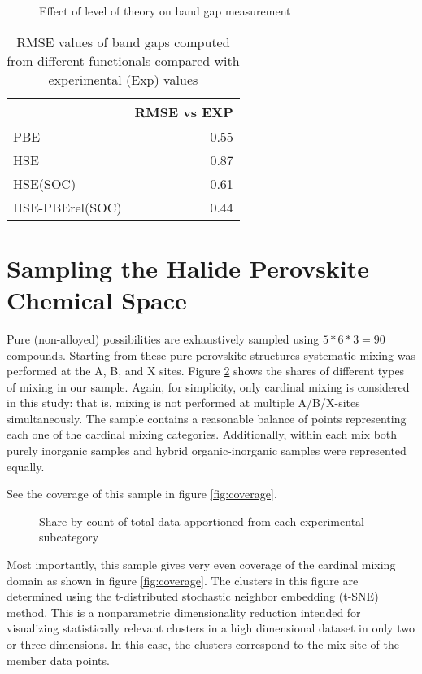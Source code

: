  
\begin{figure}[htbp]
\centering

\caption{\label{fig:expqual} Effect of level of theory on band gap measurement}
\end{figure}

 
\begin{table}[htbp]
\caption{\label{tbl:expquant} RMSE values of band gaps computed from different functionals compared with experimental (Exp) values}
\centering
\begin{tabular}{lr}
 & RMSE vs EXP\\[0pt]
\hline
PBE & 0.55\\[0pt]
HSE & 0.87\\[0pt]
HSE(SOC) & 0.61\\[0pt]
HSE-PBErel(SOC) & 0.44\\[0pt]
\end{tabular}
\end{table}

\section{Sampling the Halide Perovskite Chemical Space}
\label{sec:orgb990473}
Pure (non-alloyed) possibilities are exhaustively sampled using \(5*6*3 = 90\) compounds.
Starting from these pure perovskite structures systematic mixing was performed at the A, B, and X sites.
Figure \ref{fig:lot_mix_org} shows the shares of different types of mixing in our sample.
Again, for simplicity, only cardinal mixing is considered in this study: that is, mixing is not performed at multiple A/B/X-sites simultaneously.
The sample contains a reasonable balance of points representing each one of the cardinal mixing categories.
Additionally, within each mix both purely inorganic samples and hybrid organic-inorganic samples were represented equally.

See the coverage of this sample in figure \ref{fig:coverage}.

 
\begin{figure}[htbp]
\centering

\caption{\label{fig:lot_mix_org} Share by count of total data apportioned from each experimental subcategory}
\end{figure}

Most importantly, this sample gives very even coverage of the cardinal mixing domain as shown in figure \ref{fig:coverage}.
The clusters in this figure are determined using the t-distributed stochastic neighbor embedding (t-SNE) method.
This is a nonparametric dimensionality reduction intended for visualizing statistically relevant clusters in a high dimensional dataset in only two or three dimensions.
In this case, the clusters correspond to the mix site of the member data points.

